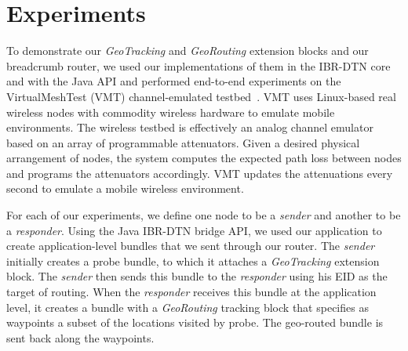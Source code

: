 \section{Experiments}\label{sec:experiments}
To demonstrate our {\em GeoTracking} and {\em GeoRouting} extension
blocks and our {\sc breadcrumb} router, we used our implementations of
them in the IBR-DTN core and with the Java API and performed
end-to-end experiments on the VirtualMeshTest (VMT) channel-emulated
testbed~\cite{hahn10:using, kim11:reality}.  VMT uses Linux-based real
wireless nodes with commodity wireless hardware to emulate mobile
environments.  The wireless testbed is effectively an analog channel
emulator based on an array of programmable attenuators.  Given a
desired physical arrangement of nodes, the system computes the
expected path loss between nodes and programs the attenuators
accordingly.  VMT updates the attenuations every second to emulate a
mobile wireless environment.

For each of our experiments, we define one node to be a {\em
  sender} and another to be a {\em responder}. Using the Java IBR-DTN
bridge API, we used our application to create application-level
bundles that we sent through our router. The {\em sender} initially
creates a probe bundle, to which it attaches a {\em GeoTracking}
extension block. The {\em sender} then sends this bundle to the {\em
  responder} using his EID as the target of routing. When the {\em
  responder} receives this bundle at the application level, it creates
a bundle with a {\em GeoRouting} tracking block that specifies as
waypoints a subset of the locations visited by probe. The geo-routed
bundle is sent back along the waypoints.


